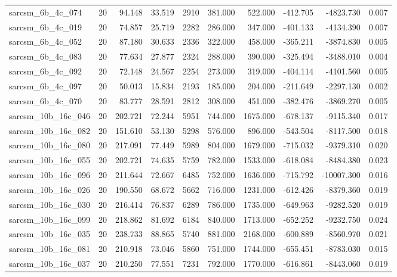 \begin{tabular}{lrrrrrrrrr}
sarcsm\_6b\_4c\_074 & 20 & 94.148 & 33.519 & 2910 & 381.000 & 522.000 & -412.705 & -4823.730 & 0.007 \\
sarcsm\_6b\_4c\_019 & 20 & 74.857 & 25.719 & 2282 & 286.000 & 347.000 & -401.133 & -4134.390 & 0.007 \\
sarcsm\_6b\_4c\_052 & 20 & 87.180 & 30.633 & 2336 & 322.000 & 458.000 & -365.211 & -3874.830 & 0.005 \\
sarcsm\_6b\_4c\_083 & 20 & 77.634 & 27.877 & 2324 & 288.000 & 390.000 & -325.494 & -3488.010 & 0.004 \\
sarcsm\_6b\_4c\_092 & 20 & 72.148 & 24.567 & 2254 & 273.000 & 319.000 & -404.114 & -4101.560 & 0.005 \\
sarcsm\_6b\_4c\_097 & 20 & 50.013 & 15.834 & 2193 & 185.000 & 204.000 & -211.649 & -2297.130 & 0.002 \\
sarcsm\_6b\_4c\_070 & 20 & 83.777 & 28.591 & 2812 & 308.000 & 451.000 & -382.476 & -3869.270 & 0.005 \\
sarcsm\_10b\_16c\_046 & 20 & 202.721 & 72.244 & 5951 & 744.000 & 1675.000 & -678.137 & -9115.340 & 0.017 \\
sarcsm\_10b\_16c\_082 & 20 & 151.610 & 53.130 & 5298 & 576.000 & 896.000 & -543.504 & -8117.500 & 0.018 \\
sarcsm\_10b\_16c\_080 & 20 & 217.091 & 77.449 & 5989 & 804.000 & 1679.000 & -715.032 & -9379.310 & 0.020 \\
sarcsm\_10b\_16c\_055 & 20 & 202.721 & 74.635 & 5759 & 782.000 & 1533.000 & -618.084 & -8484.380 & 0.023 \\
sarcsm\_10b\_16c\_096 & 20 & 211.644 & 72.667 & 6485 & 752.000 & 1636.000 & -715.792 & -10007.300 & 0.016 \\
sarcsm\_10b\_16c\_026 & 20 & 190.550 & 68.672 & 5662 & 716.000 & 1231.000 & -612.426 & -8379.360 & 0.019 \\
sarcsm\_10b\_16c\_030 & 20 & 216.414 & 76.837 & 6289 & 786.000 & 1735.000 & -649.963 & -9282.520 & 0.019 \\
sarcsm\_10b\_16c\_099 & 20 & 218.862 & 81.692 & 6184 & 840.000 & 1713.000 & -652.252 & -9232.750 & 0.024 \\
sarcsm\_10b\_16c\_035 & 20 & 238.733 & 88.865 & 5740 & 881.000 & 2168.000 & -600.889 & -8560.970 & 0.021 \\
sarcsm\_10b\_16c\_081 & 20 & 210.918 & 73.046 & 5860 & 751.000 & 1744.000 & -655.451 & -8783.030 & 0.015 \\
sarcsm\_10b\_16c\_037 & 20 & 210.250 & 77.551 & 7231 & 792.000 & 1770.000 & -616.861 & -8443.060 & 0.019 \\

\end{tabular}
